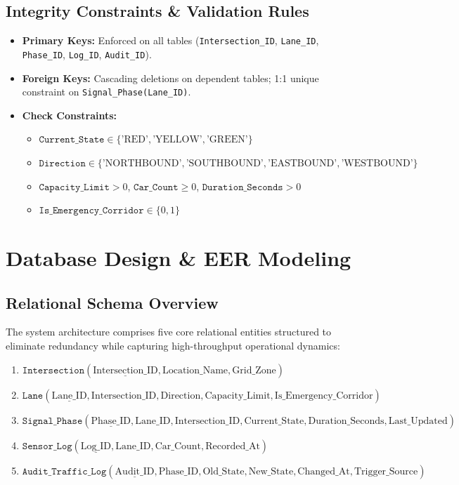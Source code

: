 \documentclass[11pt,a4paper]{report}
\begin{document}
\section{Integrity Constraints \& Validation Rules}
\begin{itemize}
    \item \textbf{Primary Keys:} Enforced on all tables (\texttt{Intersection\_ID}, \texttt{Lane\_ID}, \texttt{Phase\_ID}, \texttt{Log\_ID}, \texttt{Audit\_ID}).
    \item \textbf{Foreign Keys:} Cascading deletions on dependent tables; 1:1 unique constraint on \texttt{Signal\_Phase(Lane\_ID)}.
    \item \textbf{Check Constraints:}
    \begin{itemize}
        \item $\texttt{Current\_State} \in \{\text{'RED'}, \text{'YELLOW'}, \text{'GREEN'}\}$
        \item $\texttt{Direction} \in \{\text{'NORTHBOUND'}, \text{'SOUTHBOUND'}, \text{'EASTBOUND'}, \text{'WESTBOUND'}\}$
        \item $\texttt{Capacity\_Limit} > 0$, $\texttt{Car\_Count} \ge 0$, $\texttt{Duration\_Seconds} > 0$
        \item $\texttt{Is\_Emergency\_Corridor} \in \{0, 1\}$
    \end{itemize}
\end{itemize}

\chapter{Database Design \& EER Modeling}

\section{Relational Schema Overview}
The system architecture comprises five core relational entities structured to eliminate redundancy while capturing high-throughput operational dynamics:
\begin{enumerate}
    \item $\texttt{Intersection}(\underline{\text{Intersection\_ID}}, \text{Location\_Name}, \text{Grid\_Zone})$
    \item $\texttt{Lane}(\underline{\text{Lane\_ID}}, \text{Intersection\_ID}, \text{Direction}, \text{Capacity\_Limit}, \text{Is\_Emergency\_Corridor})$
    \item $\texttt{Signal\_Phase}(\underline{\text{Phase\_ID}}, \text{Lane\_ID}, \text{Intersection\_ID}, \text{Current\_State}, \text{Duration\_Seconds}, \text{Last\_Updated})$
    \item $\texttt{Sensor\_Log}(\underline{\text{Log\_ID}}, \text{Lane\_ID}, \text{Car\_Count}, \text{Recorded\_At})$
    \item $\texttt{Audit\_Traffic\_Log}(\underline{\text{Audit\_ID}}, \text{Phase\_ID}, \text{Old\_State}, \text{New\_State}, \text{Changed\_At}, \text{Trigger\_Source})$
\end{enumerate}
\end{document}
